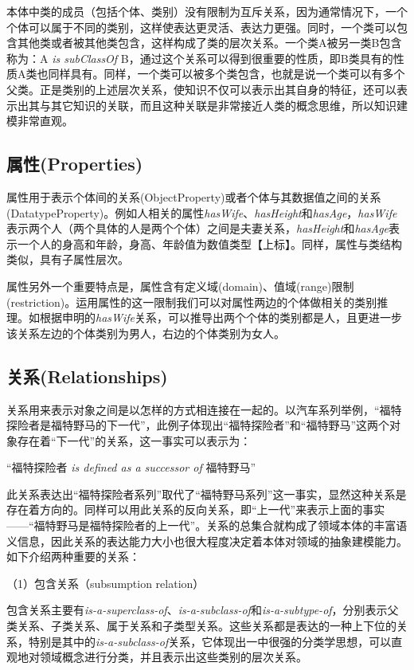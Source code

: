 本体中类的成员（包括个体、类别）没有限制为互斥关系，因为通常情况下，一个个体可以属于不同的类别，这样使表达更灵活、表达力更强。同时，一个类可以包含其他类或者被其他类包含，这样构成了类的层次关系。一个类A被另一类B包含称为：A \textit{is subClassOf} B，通过这个关系可以得到很重要的性质，即B类具有的性质A类也同样具有。同样，一个类可以被多个类包含，也就是说一个类可以有多个父类。正是类别的上述层次关系，使知识不仅可以表示出其自身的特征，还可以表示出其与其它知识的关联，而且这种关联是非常接近人类的概念思维，所以知识建模非常直观。

\subsection{属性(Properties)}
属性用于表示个体间的关系(ObjectProperty)或者个体与其数据值之间的关系(DatatypeProperty)。例如人相关的属性\textit{hasWife}、\textit{hasHeight}和\textit{hasAge}，\textit{hasWife}表示两个人（两个具体的人是两个个体）之间是夫妻关系，\textit{hasHeight}和\textit{hasAge}表示一个人的身高和年龄，身高、年龄值为数值类型【上标】。同样，属性与类结构类似，具有子属性层次。

属性另外一个重要特点是，属性含有定义域(domain)、值域(range)限制(restriction)。运用属性的这一限制我们可以对属性两边的个体做相关的类别推理。如根据申明的\textit{hasWife}关系，可以推导出两个个体的类别都是人，且更进一步该关系左边的个体类别为男人，右边的个体类别为女人。

\subsection{关系(Relationships)}
关系用来表示对象之间是以怎样的方式相连接在一起的。以汽车系列举例，“福特探险者是福特野马的下一代”，此例子体现出“福特探险者”和“福特野马”这两个对象存在着“下一代”的关系，这一事实可以表示为：

\begin{center}
	“福特探险者 \textit{is defined as a successor of} 福特野马”
\end{center}

此关系表达出“福特探险者系列”取代了“福特野马系列”这一事实，显然这种关系是存在着方向的。同样可以用此关系的反向关系，即“上一代”来表示上面的事实——“福特野马是福特探险者的上一代”。关系的总集合就构成了领域本体的丰富语义信息，因此关系的表达能力大小也很大程度决定着本体对领域的抽象建模能力。如下介绍两种重要的关系：

（1）包含关系（subsumption relation）

包含关系主要有\textit{is-a-superclass-of}、\textit{is-a-subclass-of}和\textit{is-a-subtype-of}，分别表示父类关系、子类关系、属于关系和子类型关系。这些关系都是表达的一种上下位的关系，特别是其中的\textit{is-a-subclass-of}关系，它体现出一中很强的分类学思想，可以直观地对领域概念进行分类，并且表示出这些类别的层次关系。

